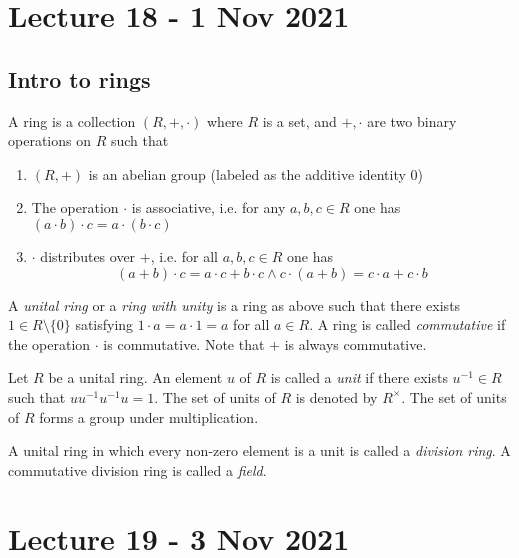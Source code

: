 \documentclass[11pt]{scrartcl}
\begin{document}
\section{Lecture 18 - 1 Nov 2021}

\subsection{Intro to rings}

\begin{definition}
  A ring is a collection $(R,+,\cdot)$ where $R$ is a set, and $+,\cdot$ are two binary
  operations on $R$ such that
  \begin{enumerate}
    \item $(R,+)$ is an abelian group (labeled as the additive identity $0$)
    \item The operation $\cdot$ is associative, i.e. for any $a,b,c\in R$ one has
      $(a\cdot b)\cdot c = a\cdot (b\cdot c)$
    \item $\cdot$ distributes over $+$, i.e. for all $a,b,c\in R$ one has
      \[(a+b)\cdot c = a\cdot c+b\cdot c \land c\cdot (a+b)=c\cdot a + c\cdot b\]
  \end{enumerate}
  A \emph{unital ring} or a \emph{ring with unity} is a ring as above such that there
  exists $1\in R\setminus \{0\}$ satisfying $1\cdot a = a\cdot 1 = a$ for all $a\in R$.
  A ring is called \emph{commutative} if the operation $\cdot$ is commutative. Note that
  $+$ is always commutative.
  \label{def:ring}
\end{definition}

\begin{definition}
  Let $R$ be a unital ring. An element $u$ of $R$ is called a \emph{unit} if there exists
  $u^{-1}\in R$ such that $uu^{-1}u^{-1}u=1$. The set of units of $R$ is denoted by
  $R^{\times}$. The set of units of $R$ forms a group under multiplication.
  \label{<+label+>}
\end{definition}

\begin{definition}
  A unital ring in which every non-zero element is a unit is called a \emph{division
  ring}. A commutative division ring is called a \emph{field}.
  \label{<+label+>}
\end{definition}

\section{Lecture 19 - 3 Nov 2021}
\end{document}
